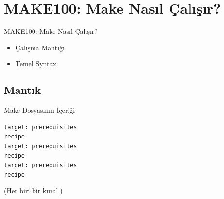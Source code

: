\documentclass{beamer}
\begin{document}
\section{MAKE100: Make Nasıl Çalışır?}
{
\begin{frame}
    {MAKE100: Make Nasıl Çalışır?}
    \begin{itemize}
        \item{Çalışma Mantığı}
        \item{Temel Syntax}
    \end{itemize}
\end{frame}
}

\subsection{Mantık}
\begin{frame}
    {Make Dosyasının İçeriği}

    \texttt{target: prerequisites\\ \hspace{10mm}recipe }\\\vspace{3mm}
    \texttt{target: prerequisites\\ \hspace{10mm}recipe }\\\vspace{3mm}
    \texttt{target: prerequisites\\ \hspace{10mm}recipe }\\\vspace{3mm}

    (Her biri bir kural.)

\end{frame}
\end{document}
